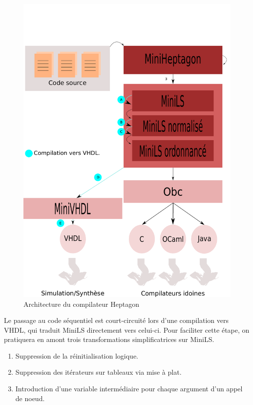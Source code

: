 \documentclass[a4paper]{article}
\newcommand{\LANG}{Heptagon}
\begin{document}
\begin{figure}[htp]
  \centering
  \includegraphics[scale=0.5]{archi}
  \caption{Architecture du compilateur \LANG}
  \label{fig:archi}
\end{figure}

Le passage au code s\'equentiel est court-circuit\'e lors d'une compilation vers
VHDL, qui traduit MiniLS directement vers celui-ci. Pour faciliter cette \'etape,
on pratiquera en amont trois transformations simplificatrices sur MiniLS.

\renewcommand{\labelenumi}{\Alph{enumi}}
\begin{enumerate}
\item Suppression de la r\'einitialisation logique.
\item Suppression des it\'erateurs sur tableaux via mise \`a plat.
\item Introduction d'une variable interm\'ediaire pour chaque argument d'un appel
  de noeud.
\end{enumerate}
\end{document}
